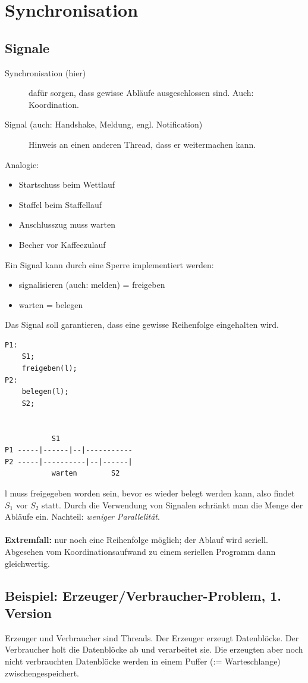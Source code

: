 \chapter{Synchronisation}

\section{Signale}
\begin{description}
	\item[Synchronisation (hier)] dafür sorgen, dass gewisse Abläufe ausgeschlossen sind. Auch: Koordination.
	\item[Signal (auch: Handshake, Meldung, engl. Notification)] Hinweis an einen anderen Thread, dass er weitermachen kann.
\end{description}
Analogie:
\begin{itemize}
	\item Startschuss beim Wettlauf
	\item Staffel beim Staffellauf
	\item Anschlusszug muss warten
	\item Becher vor Kaffeezulauf
\end{itemize}
Ein Signal kann durch eine Sperre implementiert werden:
\begin{itemize}
	\item signalisieren (auch: melden) = freigeben
	\item warten = belegen
\end{itemize}
Das Signal soll garantieren, dass eine gewisse Reihenfolge eingehalten wird.
\begin{lstlisting}
P1:
	S1;
	freigeben(l);
P2:
	belegen(l);
	S2;


           S1
P1 -----|------|--|-----------
P2 -----|----------|--|------|
           warten        S2
\end{lstlisting}
l muss freigegeben worden sein, bevor es wieder belegt werden kann, also findet $S_1$ vor $S_2$ statt. Durch die Verwendung von Signalen schränkt man die Menge der Abläufe ein. Nachteil: \emph{weniger Parallelität}.\\
\\
\textbf{Extremfall:} nur noch eine Reihenfolge möglich; der Ablauf wird seriell. Abgesehen vom Koordinationsaufwand zu einem seriellen Programm dann gleichwertig.

\section[Beispiel: Erzeuger/Verbraucher (1)]{Beispiel: Erzeuger/Verbraucher-Problem, 1. Version}
Erzeuger und Verbraucher sind Threads. Der Erzeuger erzeugt Datenblöcke. Der Verbraucher holt die Datenblöcke ab und verarbeitet sie. Die erzeugten aber noch nicht verbrauchten Datenblöcke werden in einem Puffer (:= Warteschlange) zwischengespeichert.

